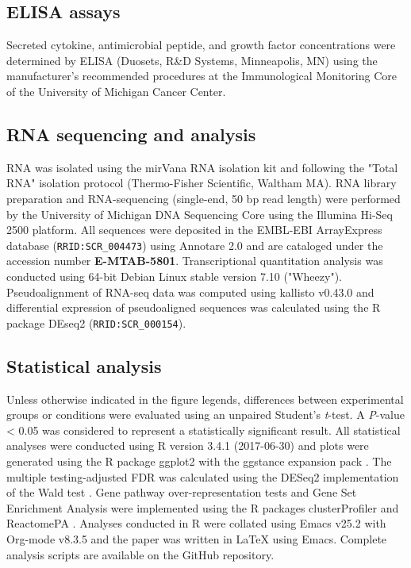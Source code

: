 \documentclass[9pt,lineo]{elife}
\begin{document}
\subsection*{{\bfseries\sffamily } ELISA assays}
\label{sec:orgheadline24}
Secreted cytokine, antimicrobial peptide, and growth factor concentrations were determined by ELISA (Duosets, R\&D Systems, Minneapolis, MN) using the manufacturer's recommended procedures at the Immunological Monitoring Core of the University of Michigan Cancer Center.
\subsection*{{\bfseries\sffamily } RNA sequencing and analysis}
\label{sec:orgheadline25}
RNA was isolated using the mirVana RNA isolation kit and following the "Total RNA" isolation protocol (Thermo-Fisher Scientific, Waltham MA). RNA library preparation and RNA-sequencing (single-end, 50 bp read length) were performed by the University of Michigan DNA Sequencing Core using the Illumina Hi-Seq 2500 platform. All sequences were deposited in the EMBL-EBI ArrayExpress database (\texttt{RRID:SCR\_004473}) using Annotare 2.0 and are cataloged under the accession number \textbf{E-MTAB-5801}. Transcriptional quantitation analysis was conducted using 64-bit Debian Linux stable version 7.10 ("Wheezy"). Pseudoalignment of RNA-seq data was computed using kallisto v0.43.0 \citep{Bray:2016} and differential expression of pseudoaligned sequences was calculated using the R package DEseq2 \citep{Love:2014} (\texttt{RRID:SCR\_000154}). 
\subsection*{{\bfseries\sffamily } Statistical analysis}
\label{sec:orgheadline26}
Unless otherwise indicated in the figure legends, differences between experimental groups or conditions were evaluated using an unpaired Student's \emph{t}-test. A \emph{P}-value < 0.05 was considered to represent a statistically significant result. All statistical analyses were conducted using R version 3.4.1 (2017-06-30) \citep{CRAN:2017} and plots were generated using the R package ggplot2 \citep{Wickham:2009} with the ggstance expansion pack \cite{Henry:2016}. The multiple testing-adjusted FDR was calculated using the DESeq2 implementation of the Wald test \citep{Love:2014}. Gene pathway over-representation tests and Gene Set Enrichment Analysis \citep{Subramanian:2005} were implemented using the R packages clusterProfiler \citep{Yu:2012} and ReactomePA \citep{Yu:2016}. Analyses conducted in R were collated using Emacs v25.2 \citep{Stallman:1981:EEC:1159890.806466} with Org-mode v8.3.5 and the paper was written in \LaTeX{} using Emacs. Complete analysis scripts are available on the \cite{Hill:gita} GitHub repository.
\end{document}
